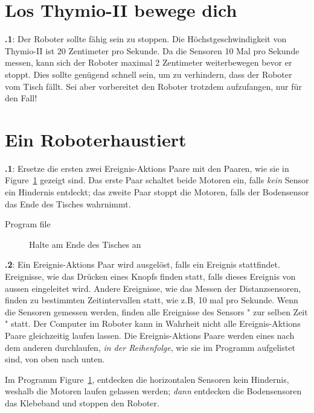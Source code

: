 \documentclass[12pt,a4paper]{article}
\begin{document}
\section{Los Thymio-II bewege dich}

\textbf{\thesection.1}: 
Der Roboter sollte fähig sein zu stoppen. Die Höchstgeschwindigkeit von Thymio-II ist 20 Zentimeter pro Sekunde. Da die Sensoren 10 Mal pro Sekunde messen, kann sich der Roboter maximal 2 Zentimeter weiterbewegen bevor er stoppt. Dies sollte genügend schnell sein, um zu verhindern, dass der Roboter vom Tisch fällt. Sei aber vorbereitet den Roboter trotzdem aufzufangen, nur für den Fall!


\section{Ein Roboterhaustiert}

\textbf{\thesection.1}:
Ersetze die ersten zwei Ereignis-Aktions Paare mit den Paaren, wie sie in Figure~\ref{fig.answer1} gezeigt sind. Das erste Paar schaltet beide Motoren ein, falls \emph{kein} Sensor ein Hindernis entdeckt; das zweite Paar stoppt die Motoren, falls der Bodensensor das Ende des Tisches wahrnimmt.

{\raggedleft \hfill Program file }

\begin{figure}[hbt]
\begin{center}
\caption{Halte am Ende des Tisches an}\label{fig.answer1}
\end{center}
\end{figure}

\textbf{\thesection.2}:
Ein Ereignis-Aktions Paar wird ausgelöst, falls ein Ereignis stattfindet. Ereignisse, wie das Drücken eines Knopfs finden statt, falls dieses Ereignis von aussen eingeleitet wird. Andere Ereignisse, wie das Messen der Distanzsensoren, finden zu bestimmten Zeitintervallen statt, wie z.B, 10 mal pro Sekunde. Wenn die Sensoren gemessen werden, finden alle Ereignisse des Sensors " zur selben Zeit " statt. Der Computer im Roboter kann in Wahrheit nicht alle Ereignis-Aktions Paare gleichzeitig laufen lassen. Die Ereignis-Aktions Paare werden eines nach dem anderen durchlaufen, \emph{in der Reihenfolge}, wie sie im Programm aufgelistet sind, von oben nach unten.

Im Programm Figure~\ref{fig.answer1}, entdecken die horizontalen Sensoren kein Hindernis, weshalb die Motoren laufen gelassen werden; \emph{dann} entdecken die Bodensensoren das Klebeband und stoppen den Roboter.
\end{document}
